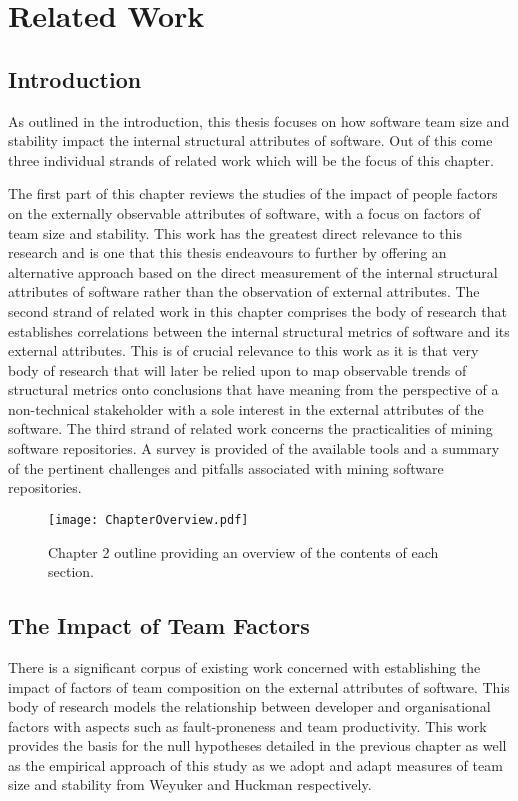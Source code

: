 
\graphicspath{{Chapter2/Figures/}{Chapter2/Tables/}{Chapter2/Charts/}}
\setlength{\parskip}{2ex}

\chapter{Related Work}

\section{Introduction} %
As outlined in the introduction, this thesis focuses on how software team size and stability impact the internal structural attributes of software. Out of this come three individual strands of related work which will be the focus of this chapter. 

The first part of this chapter reviews the studies of the impact of people factors on the externally observable attributes of software, with a focus on factors of team size and stability. This work has the greatest direct relevance to this research and is one that this thesis endeavours to further by offering an alternative approach based on the direct measurement of the internal structural attributes of software rather than the observation of external attributes. The second strand of related work in this chapter comprises the body of research that establishes correlations between the internal structural metrics of software and its external attributes. This is of crucial relevance to this work as it is that very body of research that will later be relied upon to map observable trends of structural metrics onto conclusions that have meaning from the perspective of a non-technical stakeholder with a sole interest in the external attributes of the software. The third strand of related work concerns the practicalities of mining software repositories. A survey is provided of the available tools and a summary of the pertinent challenges and pitfalls associated with mining software repositories.

\begin{figure}[htbp!] 
\centering    
\texttt{[image: ChapterOverview.pdf]}
\caption{Chapter 2 outline providing an overview of the contents of each section.}
\label{fig:ChapterOverview}
\end{figure}

\section{The Impact of Team Factors} %
There is a significant corpus of existing work concerned with establishing the impact of factors of team composition on the external attributes of software. This body of research models the relationship between developer and organisational factors with aspects such as fault-proneness and team productivity. This work provides the basis for the null hypotheses detailed in the previous chapter as well as the empirical approach of this study as we adopt and adapt measures of team size and stability from Weyuker and Huckman respectively. 

